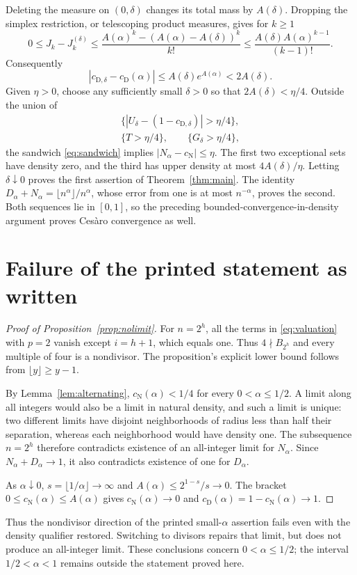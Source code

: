 \documentclass[10pt]{article}
\theoremstyle{remark}
\newcommand{\cn}{c_{\mathrm N}}
\newcommand{\cd}{c_{\mathrm D}}
\begin{document}
Deleting the measure on $(0,\delta)$ changes its total mass by
$A(\delta)$. Dropping the simplex restriction, or telescoping product
measures, gives for $k\geq1$
\[
 0\leq J_k-J_k^{(\delta)}
 \leq\frac{A(\alpha)^k-(A(\alpha)-A(\delta))^k}{k!}
 \leq\frac{A(\delta)A(\alpha)^{k-1}}{(k-1)!}.
\]
Consequently
\begin{equation}\label{eq:deltaerror}
 |c_{\mathrm D,\delta}-\cd(\alpha)|
 \leq A(\delta)e^{A(\alpha)}<2A(\delta).
\end{equation}
Given $\eta>0$, choose any sufficiently small $\delta>0$ so that
$2A(\delta)<\eta/4$. Outside the union of
\[
 \begin{gathered}
 \{|U_\delta-(1-c_{\mathrm D,\delta})|>\eta/4\},\\
 \{T>\eta/4\},\qquad \{G_\delta>\eta/4\},
 \end{gathered}
\]
the sandwich \eqref{eq:sandwich} implies $|N_\alpha-\cn|\leq\eta$.
The first two exceptional sets have density zero, and the third has
upper density at most $4A(\delta)/\eta$. Letting $\delta\downarrow0$
proves the first assertion of Theorem~\ref{thm:main}. The identity
$D_\alpha+N_\alpha=\lfloor n^\alpha\rfloor/n^\alpha$, whose error from
one is at most $n^{-\alpha}$, proves the second. Both sequences lie in
$[0,1]$, so the preceding bounded-convergence-in-density argument
proves Ces\`aro convergence as well.

\section{Failure of the printed statement as written}\label{sec:false}
\begin{proof}[Proof of Proposition~\ref{prop:nolimit}]
For $n=2^h$, all the terms in \eqref{eq:valuation} with $p=2$ vanish
except $i=h+1$, which equals one. Thus $4\nmid B_{2^h}$ and every
multiple of four is a nondivisor. The proposition's explicit lower
bound follows from $\lfloor y\rfloor\geq y-1$.

By Lemma~\ref{lem:alternating}, $\cn(\alpha)<1/4$ for every
$0<\alpha\leq1/2$. A limit along all integers would also be a limit
in natural density, and such a limit is unique: two different limits
have disjoint neighborhoods of radius less than half their separation,
whereas each neighborhood would have density one. The subsequence
$n=2^h$ therefore contradicts existence of an all-integer limit for
$N_\alpha$. Since $N_\alpha+D_\alpha\to1$, it also contradicts
existence of one for $D_\alpha$.

As $\alpha\downarrow0$, $s=\lfloor1/\alpha\rfloor\to\infty$ and
$A(\alpha)\leq2^{1-s}/s\to0$. The bracket
$0\leq\cn(\alpha)\leq A(\alpha)$ gives $\cn(\alpha)\to0$ and
$\cd(\alpha)=1-\cn(\alpha)\to1$.
\end{proof}
Thus the nondivisor direction of the printed small-$\alpha$ assertion
fails even with the density qualifier restored. Switching to divisors
repairs that limit, but does not produce an all-integer limit. These
conclusions concern $0<\alpha\leq1/2$; the interval $1/2<\alpha<1$
remains outside the statement proved here.
\end{document}
